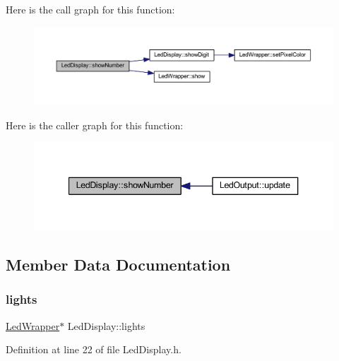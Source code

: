 Here is the call graph for this function\+:
\nopagebreak
\begin{figure}[H]
\begin{center}
\leavevmode
\includegraphics[width=350pt]{class_led_display_a673f0b08b216cc8a02a8a70fbbc54687_cgraph}
\end{center}
\end{figure}
Here is the caller graph for this function\+:
\nopagebreak
\begin{figure}[H]
\begin{center}
\leavevmode
\includegraphics[width=340pt]{class_led_display_a673f0b08b216cc8a02a8a70fbbc54687_icgraph}
\end{center}
\end{figure}


\subsection{Member Data Documentation}
\mbox{\label{class_led_display_aa3c3d533c862065bd817c016f8fd1cab}} 
\subsubsection{\texorpdfstring{lights}{lights}}
{\footnotesize\ttfamily \hyperlink{class_led_wrapper}{Led\+Wrapper}$\ast$ Led\+Display\+::lights\hspace{0.3cm}{\ttfamily [private]}}



Definition at line 22 of file Led\+Display.\+h.

\mbox{\label{class_led_display_aef7ced23d44c457c19c3d0f4f88af940}} 
